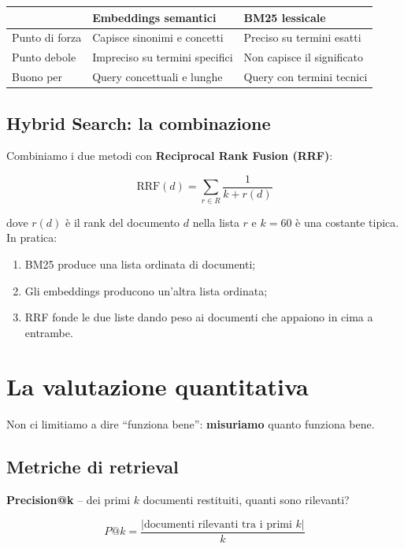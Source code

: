 \documentclass[12pt,a4paper]{article}
\begin{document}
\begin{center}
\begin{tabular}{lll}
\toprule
 & \textbf{Embeddings semantici} & \textbf{BM25 lessicale} \\
\midrule
Punto di forza & Capisce sinonimi e concetti & Preciso su termini esatti \\
Punto debole   & Impreciso su termini specifici & Non capisce il significato \\
Buono per      & Query concettuali e lunghe & Query con termini tecnici \\
\bottomrule
\end{tabular}
\end{center}

\subsection{Hybrid Search: la combinazione}

Combiniamo i due metodi con \textbf{Reciprocal Rank Fusion (RRF)}:

\[
\text{RRF}(d) = \sum_{r \in R} \frac{1}{k + r(d)}
\]

dove $r(d)$ \`e il rank del documento $d$ nella lista $r$ e $k = 60$ \`e una costante tipica. In pratica:

\begin{enumerate}
  \item BM25 produce una lista ordinata di documenti;
  \item Gli embeddings producono un'altra lista ordinata;
  \item RRF fonde le due liste dando peso ai documenti che appaiono in cima a entrambe.
\end{enumerate}

\section{La valutazione quantitativa}

Non ci limitiamo a dire ``funziona bene'': \textbf{misuriamo} quanto funziona bene.

\subsection{Metriche di retrieval}

\textbf{Precision@k} -- dei primi $k$ documenti restituiti, quanti sono rilevanti?

\[
P@k = \frac{|\text{documenti rilevanti tra i primi } k|}{k}
\]
\end{document}
